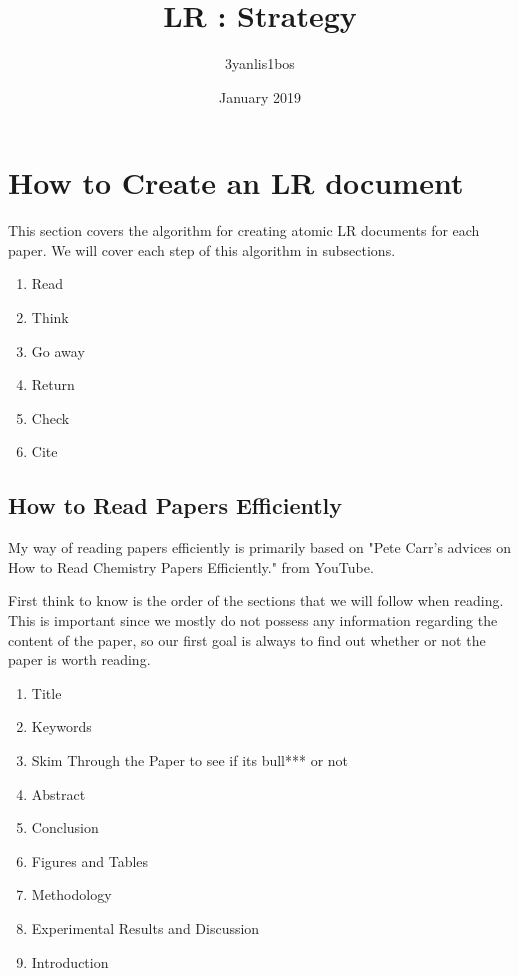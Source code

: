 \documentclass{article}
\title{LR : Strategy}
\author{3yanlis1bos}
\date{January 2019}
\begin{document}
\maketitle

\section{How to Create an LR document}

This section covers the algorithm for creating atomic LR documents for each paper. We will cover each step of this algorithm in subsections.

\begin{enumerate}
    \item Read
    \item Think
    \item Go away
    \item Return
    \item Check
    \item Cite
\end{enumerate}

\subsection{How to Read Papers Efficiently}

My way of reading papers efficiently is primarily based on "Pete Carr's advices on How to Read Chemistry Papers Efficiently." from YouTube.

First think to know is the order of the sections that we will follow when reading. This is important since we mostly do not possess any information regarding the content of the paper, so our first goal is always to find out whether or not the paper is worth reading.

\begin{enumerate}
    \item Title
    \item Keywords
    \item Skim Through the Paper to see if its bull*** or not
    \item Abstract
    \item Conclusion
    \item Figures and Tables
    \item Methodology
    \item Experimental Results and Discussion
    \item Introduction
\end{enumerate}
\end{document}
